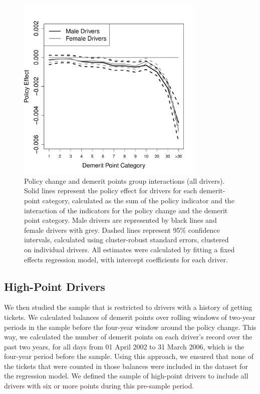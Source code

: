 \begin{figure}
\centering
\includegraphics[width=0.8\textwidth]{Figures/FFX_reg_policy_points_grp_all_pts.pdf}
\caption{Policy change and demerit points group interactions (all drivers).
Solid lines represent the policy effect for drivers for each demerit-point category, 
calculated as the sum of the policy indicator and the interaction of the  indicators for the policy change 
and the demerit point category.  
Male drivers are represented by black lines and female drivers with grey. 
Dashed lines represent 95\% confidence intervals, 
calculated using cluster-robust standard errors, clustered on individual drivers. 
All estimates were calculated by fitting a fixed effects regression model, 
with intercept coefficients for each driver. 
}\label{fig:FE_regs_all_pts}
\end{figure}






\subsection*{High-Point Drivers}


We then studied the sample that is restricted to drivers with a history of getting tickets. 
We calculated balances of demerit points over rolling windows of two-year periods 
in the sample before the four-year window around the policy change. 
This way, we calculated 
the number of demerit points on each driver's record over the past two years, 
for all days from 01 April 2002 to 31 March 2006, which is the four-year period before the sample. 
Using this approach, we ensured that none of the tickets that were counted in those balances were included in the dataset for the regression model. 
We defined the sample of high-point drivers to include all drivers with six or more points during this pre-sample period. 


